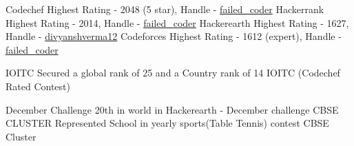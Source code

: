 \documentclass[11pt, a4paper]{awesome-cv}
\begin{document}
    \begin{cvhonors}
    \cvhonor
    {Codechef} %
    {Highest Rating - 2048 (5 star), Handle - \href{<https://www.codechef.com/users/failed_coder>}{failed\_coder} } %
    {} %
    {} %
    \cvhonor
    {Hackerrank} %
    {Highest Rating - 2014, Handle - \href{<https://www.hackerrank.com/failed_coder>}{failed\_coder} } %
    {} %
    {} %
    \cvhonor
    {Hackerearth} %
    {Highest Rating - 1627, Handle - \href{<https://www.hackerearth.com/@divyanshverma12>}{divyanshverma12} } %
    {} %
    {} %
    \cvhonor
    {Codeforces} %
    {Highest Rating - 1612 (expert), Handle - \href{<http://codeforces.com/profile/failed_coder>}{failed\_coder} } %
    {} %
    {} %
\end{cvhonors}

\begin{cvhonors}

  \cvhonor
    {IOITC} %
    {Secured a global rank of 25 and a Country rank of 14 IOITC (Codechef Rated Contest)} %
    {} %
    {} %

  \cvhonor
    {December Challenge} %
    {20th in world in Hackerearth - December challenge} %
    {} %
    {} %
    \cvhonor
    {CBSE CLUSTER} %
    {Represented School in yearly sports(Table Tennis) contest CBSE Cluster} %
    {} %
    {} %
   \end{cvhonors}
\end{document}
